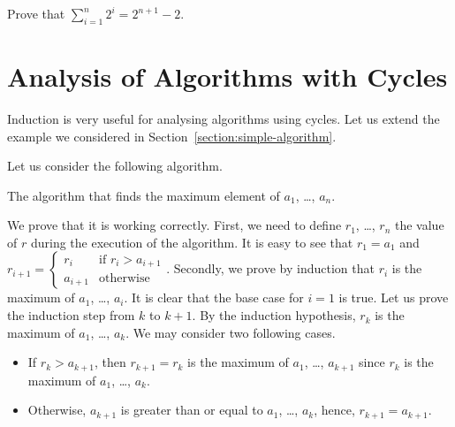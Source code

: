 \begin{exercise}
  Prove that $\sum_{i = 1}^n 2^i = 2^{n + 1} - 2$.
\end{exercise}

\section{Analysis of Algorithms with Cycles}

Induction is very useful for analysing algorithms using cycles. Let us extend
the example we considered in Section~\ref{section:simple-algorithm}.

Let us consider the following algorithm.
\begin{algorithm}
  \begin{algorithmic}[1]
        \EndIf
      \EndFor
      \State{}
    \EndFunction
  \end{algorithmic}
  \caption{The algorithm that finds the maximum element of $a_1$, \dots, $a_n$.}
\end{algorithm}
We prove that it is working correctly. First, we need to define $r_1$,
\dots, $r_n$ the value of $r$ during the execution of the algorithm.
It is easy to see that $r_1 = a_1$ and
$
  r_{i + 1} =
  \begin{cases}
    r_i & \text{if } r_i > a_{i + 1} \\
    a_{i + 1} & \text{otherwise}
  \end{cases}
$.
Secondly, we prove by induction that $r_i$ is the maximum of $a_1$, \dots,
$a_i$. It is clear that the base case for $i = 1$ is true. Let us prove the
induction step from $k$ to $k + 1$. By the induction hypothesis, $r_k$
is the maximum of $a_1$, \dots, $a_k$. We may consider two following cases.
\begin{itemize}
  \item If $r_k > a_{k + 1}$, then $r_{k + 1} = r_{k}$ is the maximum of $a_1$,
    \dots, $a_{k + 1}$ since $r_k$ is the maximum of $a_1$, \dots, $a_k$.
  \item Otherwise, $a_{k + 1}$ is greater than or equal to $a_1$, \dots, $a_k$,
    hence, $r_{k + 1} = a_{k + 1}$.
\end{itemize}

